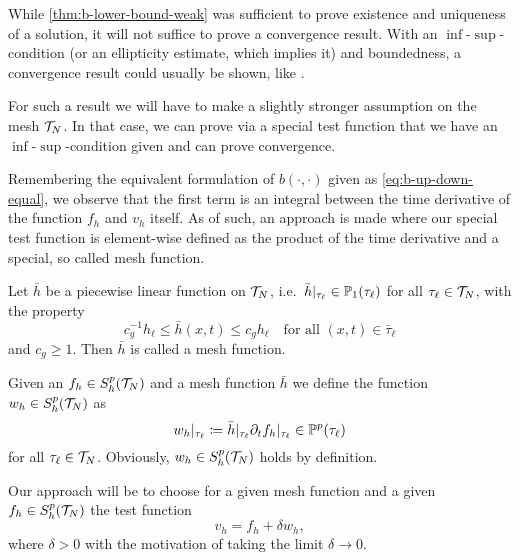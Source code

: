 \documentclass[../thesis.tex]{subfiles}
\begin{document}
While \cref{thm:b-lower-bound-weak} was sufficient to prove existence and uniqueness of a solution, it will not suffice to prove a convergence result. With an $\inf$-$\sup$-condition (or an ellipticity estimate, which implies it) and boundedness, a convergence result could usually be shown, like \cite[3.7 Hilfssatz]{Braess}.

For such a result we will have to make a slightly stronger assumption on the mesh $\mathcal{T}_N$. In that case, we can prove via a special test function that we have an $\inf$-$\sup$-condition given and can prove convergence.

Remembering the equivalent formulation of $b(\cdot, \cdot)$ given as \cref{eq:b-up-down-equal}, we observe that the first term is an integral between the time derivative of the function $f_h$ and $v_h$ itself.
As of such, an approach is made where our special test function is element-wise defined as the product of the time derivative and a special, so called mesh function.
\begin{definition}
Let $\bar{h}$ be a piecewise linear function on $\mathcal{T}_N$, i.e.\ $\bar{h}|_{\tau_\ell} \in \mathbb{P}_1(\tau_\ell)$ for all $\tau_\ell \in \mathcal{T}_N$, with the property
\[
	c_g^{-1} h_\ell \leq \bar{h}(x, t) \leq c_g h_\ell \quad \text{for all } (x, t) \in \bar{\tau}_\ell
\]
and $c_g \geq 1$. Then $\bar{h}$ is called a mesh function.
\end{definition}
Given an $f_h \in S_h^p(\mathcal{T}_N)$ and a mesh function $\bar{h}$ we define the function $w_h \in S_h^p(\mathcal{T}_N)$ as
\begin{equation}
\label{eq:wh}
	w_h|_{\tau_\ell} \coloneqq \bar{h}|_{\tau_\ell} \partial_t f_h|_{\tau_\ell} \in \mathbb{P}^p(\tau_\ell)
\end{equation}
for all $\tau_\ell \in \mathcal{T}_N$. Obviously, $w_h \in S_h^p(\mathcal{T}_N)$ holds by definition.

Our approach will be to choose for a given mesh function and a given $f_h \in S_h^p(\mathcal{T}_N)$ the test function
\[
	v_h = f_h + \delta w_h,
\]
where $\delta > 0$ with the motivation of taking the limit $\delta \to 0$.
\end{document}
